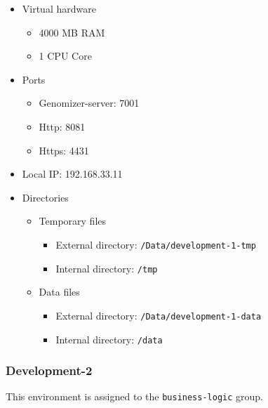 \begin{itemize}
\itemsep1pt\parskip0pt
\item
  Virtual hardware

  \begin{itemize}
  \itemsep1pt\parskip0pt
  \item
    4000 MB RAM
  \item
    1 CPU Core
  \end{itemize}
\item
  Ports

  \begin{itemize}
  \itemsep1pt\parskip0pt
  \item
    Genomizer-server: 7001
  \item
    Http: 8081
  \item
    Https: 4431
  \end{itemize}
\item
  Local IP: 192.168.33.11
\item
  Directories

  \begin{itemize}
  \itemsep1pt\parskip0pt
  \item
    Temporary files

    \begin{itemize}
    \itemsep1pt\parskip0pt
    \item
      External directory: \texttt{/Data/development-1-tmp}
    \item
      Internal directory: \texttt{/tmp}
    \end{itemize}
  \item
    Data files

    \begin{itemize}
    \itemsep1pt\parskip0pt
    \item
      External directory: \texttt{/Data/development-1-data}
    \item
      Internal directory: \texttt{/data}
    \end{itemize}
  \end{itemize}
\end{itemize}

\subsubsection{Development-2}\label{development-2}

This environment is assigned to the \texttt{business-logic} group.

